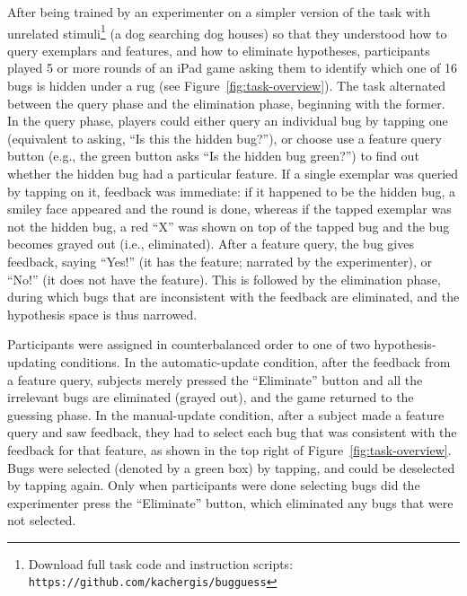 \documentclass[man,floatsintext]{apa6}
\begin{document}
After being trained by an experimenter on a simpler version of the task with unrelated stimuli\footnote{Download 
full task code and instruction scripts: \texttt{https://github.com/kachergis/bugguess}} (a dog searching dog houses) so that they understood how to query exemplars and features, and how 
to eliminate hypotheses, participants played 5 or more rounds of an iPad game asking them 
to identify which one of 16 bugs is hidden under a rug (see Figure~\ref{fig:task-overview}). 
The task alternated between the query phase and the elimination phase, beginning with the 
former. In the query phase, players could either query an individual bug by tapping one (equivalent 
to asking, ``Is this the hidden bug?''), or choose use a feature query button (e.g., the green button asks 
``Is the hidden bug green?'') to find out whether the hidden bug had a particular feature. If a 
single exemplar was queried by tapping on it, feedback was immediate: if it happened to be the 
hidden bug, a smiley face appeared and the round is done, whereas if the tapped exemplar 
was not the hidden bug, a red ``X'' was shown on top of the tapped bug and the bug becomes 
grayed out (i.e., eliminated). After a feature query, the bug gives feedback, saying 
``Yes!'' (it has the feature; narrated by the experimenter), or ``No!'' (it does not have 
the feature). This is followed by the elimination phase, during which bugs that are 
inconsistent with the feedback are eliminated, and the hypothesis space is thus narrowed. 

Participants were assigned in counterbalanced order to one of two hypothesis-updating conditions. In the automatic-update condition, after the feedback from a 
feature query, subjects merely pressed the ``Eliminate'' button and all the irrelevant bugs 
are eliminated (grayed out), and the game returned to the guessing phase. In the 
manual-update condition, after a subject made a feature query and saw feedback, 
they had to select each bug that was consistent with the feedback for that feature, as 
shown in the top right of Figure~\ref{fig:task-overview}. Bugs were selected (denoted by a green box) by 
tapping, and could be deselected by tapping again. Only when participants were done 
selecting bugs did the experimenter press the ``Eliminate'' button, which eliminated 
any bugs that were not selected. 
\end{document}
